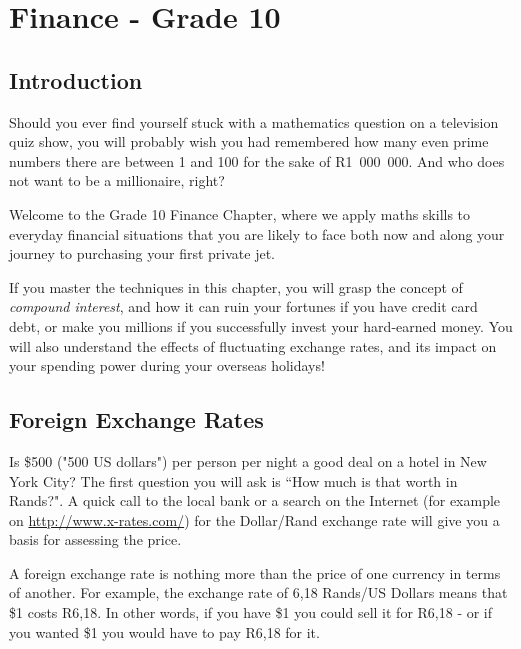 \documentclass[10pt,a4paper,titlepage,twoside,openright]{report}
\begin{document}




\chapter{Finance - Grade 10}
\label{m:f10}


\section{Introduction}
Should you ever find yourself stuck with a mathematics question on a television quiz show, you will probably wish you had remembered how many even prime numbers there are between 1 and 100 for the sake of R1~000~000. And who does not want to be a millionaire, right?

Welcome to the Grade 10 Finance Chapter, where we apply maths skills to everyday financial situations that you are likely to face both now and along your journey to purchasing your first private jet.

If you master the techniques in this chapter, you will grasp the concept of \textit{compound interest}, and how it can ruin your fortunes if you have credit card debt, or make you millions if you successfully invest your hard-earned money. You will also understand the effects of fluctuating exchange rates, and its impact on your spending power during your overseas holidays! 

\section{Foreign Exchange Rates}

Is \$500 ("500 US dollars") per person per night a good deal on a hotel in New York City? The first question you will ask is ``How much is that worth in Rands?". A quick call to the local bank or a search on the Internet (for example on \url{http://www.x-rates.com/}) for the Dollar/Rand exchange rate will give you a basis for assessing the price.

A foreign exchange rate is nothing more than the price of one currency in terms of another. For example, the exchange rate of 6,18 Rands/US Dollars means that \$1 costs R6,18. In other words, if you have \$1 you could sell it for R6,18 - or if you wanted \$1 you would have to pay R6,18 for it.
\end{document}
